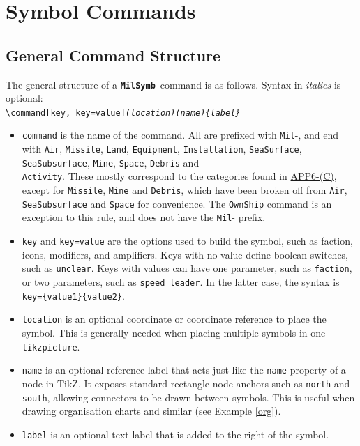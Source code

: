 \documentclass[a4paper, titlepage]{article}
\newcommand\MilSymb{\textbf{\texttt{MilSymb}}}
\newcommand\DocLink{\href{https://web.archive.org/web/20150921231042/http://armawiki.zumorc.de/files/NATO/APP-6(C).pdf}{APP6-(C)}}
\begin{document}
\section{Symbol Commands}

\subsection{General Command Structure}

The general structure of a \MilSymb\  command is as follows. Syntax in \textit{italics} is optional:\\

\texttt{\textbackslash command[key, key=value]\textit{(location)(name)\{label\}}}

\begin{itemize}
\item \texttt{command} is the name of the command. All are prefixed with \texttt{Mil}-, and end with \texttt{Air}, \texttt{Missile}, \texttt{Land}, \texttt{Equipment}, \texttt{Installation}, \texttt{SeaSurface}, \texttt{SeaSubsurface}, \texttt{Mine}, \texttt{Space}, \texttt{Debris} and\\ \texttt{Activity}. These mostly correspond to the categories found in \DocLink, except for \texttt{Missile}, \texttt{Mine} and \texttt{Debris}, which have been broken off from \texttt{Air}, \texttt{SeaSubsurface} and \texttt{Space} for convenience. The \texttt{OwnShip} command is an exception to this rule, and does not have the \texttt{Mil}- prefix.

\item \texttt{key} and \texttt{key=value} are the options used to build the symbol, such as faction, icons, modifiers, and amplifiers. Keys with no value define boolean switches, such as \texttt{unclear}. Keys with values can have one parameter, such as \texttt{faction}, or two parameters, such as \texttt{speed leader}. In the latter case, the syntax is \texttt{key=\{value1\}\{value2\}}.
\item \texttt{location} is an optional coordinate or coordinate reference to place the symbol. This is generally needed when placing multiple symbols in one \texttt{tikzpicture}.
\item \texttt{name} is an optional reference label that acts just like the \texttt{name} property of a node in TikZ. It exposes standard rectangle node anchors such as \texttt{north} and \texttt{south}, allowing connectors to be drawn between symbols. This is useful when drawing organisation charts and similar (see Example \ref{org}).
\item \texttt{label} is an optional text label that is added to the right of the symbol.
\end{itemize}
\end{document}
